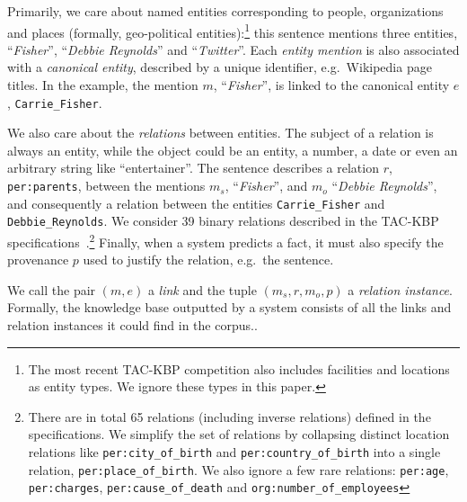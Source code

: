 Primarily, we care about named entities corresponding to people, organizations and places (formally, geo-political entities):\footnote{%
  The most recent TAC-KBP competition also includes facilities and locations as entity types. We ignore these types in this paper.}
this sentence mentions three entities,
  ``\textit{Fisher}'',
  ``\textit{Debbie Reynolds}'' and
  ``\textit{Twitter}''.
  Each \textit{entity mention} is also associated with a \textit{canonical entity}, described by a unique identifier, e.g.\ Wikipedia page titles. %
In the example, the mention $m$, ``\textit{Fisher}'', is linked to the canonical entity $e$, \texttt{Carrie\_Fisher}.

We also care about the \textit{relations} between entities.
The subject of a relation is always an entity, while the object
could be an entity, a number, a date or even an arbitrary string like ``entertainer''. 
The sentence describes a relation $r$, \texttt{per:parents}, between the mentions $m_s$, ``\textit{Fisher}'', and $m_o$ ``\textit{Debbie Reynolds}'', and consequently a relation between the entities \texttt{Carrie\_Fisher} and \texttt{Debbie\_Reynolds}.
We consider 39 binary relations described in the TAC-KBP specifications~\citep{ellis2015tackbp}.\footnote{%
  There are in total 65 relations (including inverse relations) defined in the specifications.
  We simplify the set of relations by collapsing distinct location relations like \texttt{per:city\_of\_birth} and \texttt{per:country\_of\_birth} into a single relation, \texttt{per:place\_of\_birth}.
  We also ignore a few rare relations: \texttt{per:age}, \texttt{per:charges}, \texttt{per:cause\_of\_death} and \texttt{org:number\_of\_employees}}
Finally, when a system predicts a fact, it must also specify the provenance $p$ used to justify the relation, e.g.\ the sentence.

We call the pair $(m, e)$ a \textit{link} and the tuple $(m_s, r, m_o, p)$ a \textit{relation instance}.
Formally, the knowledge base outputted by a system consists of all the links and relation instances it could find in the corpus..


